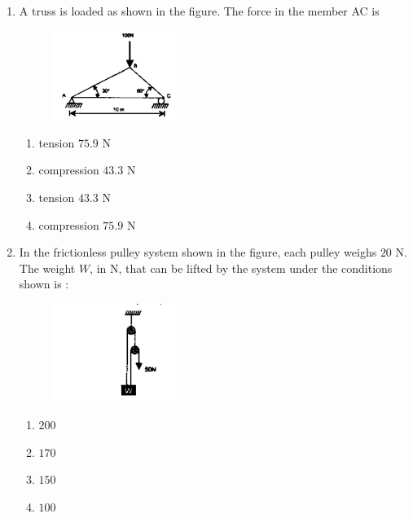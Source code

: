 \documentclass[journal,12pt,onecolumn]{IEEEtran}
\theoremstyle{remark}
\begin{document}
\begin{enumerate}
\hfill{}
\begin{multicols}{4}
\begin{enumerate}
\item $6030$
\item $5840$
\item $5750$
\item $5630$
\end{enumerate}
\end{multicols}

\item A truss is loaded as shown in the figure. The force in the member AC is

\hfill{}
\begin{figure}[H]
\centering
\includegraphics[width=0.4\textwidth]{figs/truss.png}    
\end{figure}
\begin{multicols}{2}
\begin{enumerate}
\item tension $75.9$ N
\item compression $43.3$ N
\item tension $43.3$ N
\item compression $75.9$ N
\end{enumerate}
\end{multicols}

\item In the frictionless pulley system shown in the figure, each pulley weighs $20$ N.  
The weight \( W \), in N, that can be lifted by the system under the conditions shown is $\colon$


\hfill{}

\begin{figure}[H]
\centering
\includegraphics[width=0.4\textwidth]{figs/pulley.png}
\end{figure}
\begin{multicols}{4}
\begin{enumerate}
\item $200$
\item $170$
\item $150$
\item $100$
\end{enumerate}
\end{multicols}


\end{enumerate}
\end{document}

